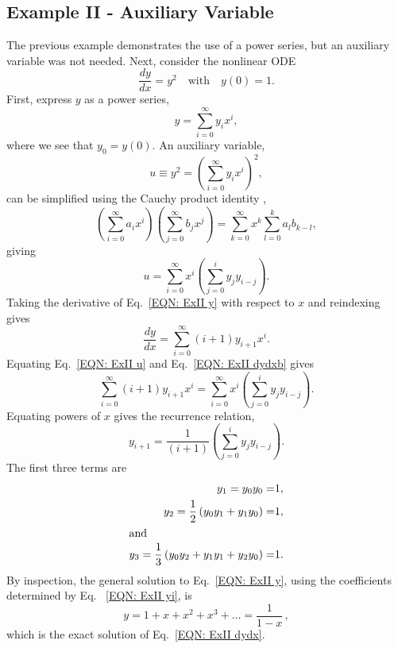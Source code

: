 \documentclass{article}
\begin{document}
\subsection{Example II - Auxiliary Variable}\label{Intro: ExII}
The previous example demonstrates the use of a power series, but an auxiliary variable was not needed. Next, consider the nonlinear ODE
    \begin{equation}\label{EQN: ExII dydx}
        \frac{dy}{dx}=y^2\quad\mbox{with}\quad y(0) =1.
    \end{equation}
First, express $y$ as a power series,
    \begin{equation}\label{EQN: ExII y}
        y=\sum_{i=0}^\infty y_ix^i,   
    \end{equation}
where we see that $y_0=y(0)$. An auxiliary variable, 
    \begin{equation*}
           u \equiv y^2 = \left(\sum_{i=0}^\infty y_i x^i\right)^2,
    \end{equation*} 
can be simplified using the Cauchy product identity \cite{Knuth1997},
    \begin{equation}\label{eqn:cauchy}
        \left(\sum_{i=0}^\infty a_ix^i\right)\left(\sum_{j=0}^\infty b_jx^j\right)=\sum_{k=0}^\infty x^k\sum_{l=0}^{k} a_lb_{k-l},
    \end{equation}
giving
    \begin{equation}\label{EQN: ExII u}   
           u=\sum_{i=0}^\infty  x^i \left(\sum_{j=0}^i y_j y_{i-j}\right).
    \end{equation}      
Taking the derivative of Eq.~\eqref{EQN: ExII y} with respect to $x$ and reindexing gives  
    \begin{equation}\label{EQN: ExII dydxb}
        \frac{dy}{dx}=\sum_{i=0}^\infty (i+1)y_{i+1}x^i.
    \end{equation}
Equating Eq.~\eqref{EQN: ExII u} and Eq.~\eqref{EQN: ExII dydxb} gives
    \begin{equation*}
        \sum_{i=0}^\infty (i+1)y_{i+1}x^i=\sum_{i=0}^\infty x^i\left(\sum_{j=0}^iy_jy_{i-j}\right). 
        \end{equation*}
Equating powers of $x$ gives the recurrence relation,
    \begin{equation}
        y_{i+1}=\frac{1}{(i+1)}\left(\sum_{j=0}^iy_jy_{i-j}\right).\label{EQN: ExII yi}
    \end{equation}
The first three terms are
    \begin{align*}
            y_1=y_0y_0=&1,\\
            y_2=\frac{1}{2}\left(y_0y_1+y_1y_0\right)=&1,\\
     \intertext{and}    
            y_3=\frac{1}{3}\left(y_0y_2+y_1y_1+y_2y_0 \right)=&1.
    \end{align*}
By inspection, the general solution to Eq.~\eqref{EQN: ExII y}, using the coefficients determined by Eq. ~\eqref{EQN: ExII yi}, is 
    \begin{equation*}
        y=1+x+x^2+x^3+\dots=\frac{1}{1-x}\,,
    \end{equation*}
which is the exact solution of Eq.~\eqref{EQN: ExII dydx}. 
\end{document}
